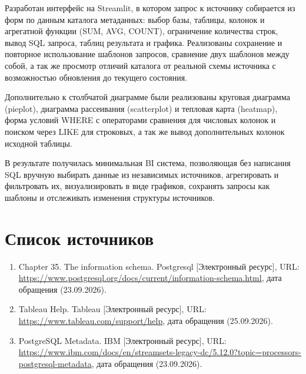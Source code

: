 \documentclass[areasetadvanced]{scrartcl}
\begin{document}
Разработан интерфейс на Streamlit, в котором запрос к источнику собирается из форм по данным каталога метаданных:
выбор базы, таблицы, колонок и агрегатной функции (SUM, AVG, COUNT), ограничение количества строк, вывод SQL запроса, таблиц результата и графика.
Реализованы сохранение и повторное использование шаблонов запросов, сравнение двух шаблонов между собой,
а так же просмотр отличий каталога от реальной схемы источника с возможностью обновления до текущего состояния.

Дополнительно к столбчатой диаграмме были реализованы круговая диаграмма (pieplot), диаграмма рассеивания (scatterplot) и тепловая карта (heatmap),
форма условий WHERE с операторами сравнения для числовых колонок и поиском через LIKE для строковых,
а так же вывод дополнительных колонок исходной таблицы.

В результате получилась минимальная BI система, позволяющая без написания SQL вручную выбирать данные из независимых источников,
агрегировать и фильтровать их, визуализировать в виде графиков, сохранять запросы как шаблоны и отслеживать изменения структуры источников.

\newpage
\section*{Список источников}
\begin{enumerate}
    \item Chapter 35. The information schema. Postgresql [Электронный ресурс], URL: \url{https://www.postgresql.org/docs/current/information-schema.html}, дата обращения (23.09.2026).
    \item Tableau Help. Tableau [Электронный ресурс], URL: \url{https://www.tableau.com/support/help}, дата обращения (25.09.2026).
    \item PostgreSQL Metadata. IBM [Электронный ресурс], URL: \url{https://www.ibm.com/docs/en/streamsets-legacy-dc/5.12.0?topic=processors-postgresql-metadata}, дата обращения (23.09.2026).
\end{enumerate}
\end{document}
